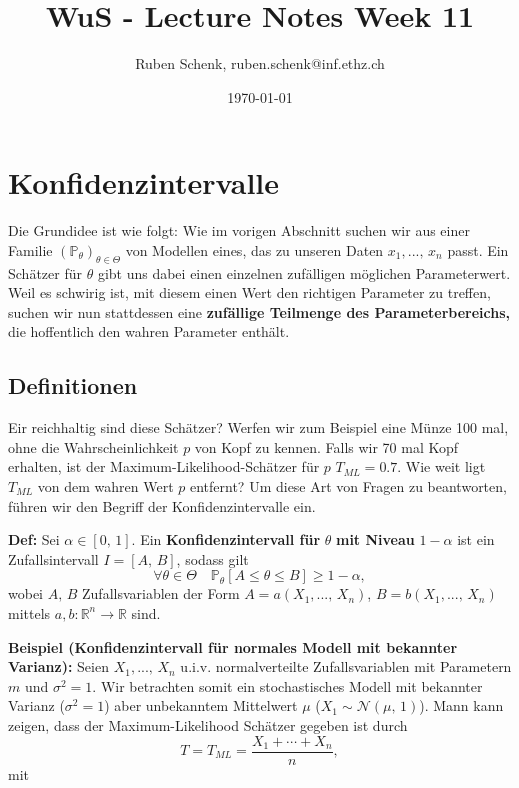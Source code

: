 \documentclass[a4paper]{extarticle}
\title{WuS - Lecture Notes Week 11}
\author{Ruben Schenk, ruben.schenk@inf.ethz.ch}
\date{\today}
\begin{document}
\maketitle

\section{Konfidenzintervalle}

Die Grundidee ist wie folgt: Wie im vorigen Abschnitt suchen wir aus einer Familie $(\mathbb{P}_{\theta})_{\theta \in \Theta}$ von Modellen eines, das zu unseren Daten $x_1,..., \, x_n$ passt. Ein Schätzer für $\theta$ gibt uns dabei einen einzelnen zufälligen möglichen Parameterwert. Weil es schwirig ist, mit diesem einen Wert den richtigen Parameter zu treffen, suchen wir nun stattdessen eine \textbf{zufällige Teilmenge des Parameterbereichs,} die hoffentlich den wahren Parameter enthält.

\subsection{Definitionen}

Eir reichhaltig sind diese Schätzer? Werfen wir zum Beispiel eine Münze 100 mal, ohne die Wahrscheinlichkeit $p$ von Kopf zu kennen. Falls wir 70 mal Kopf erhalten, ist der Maximum-Likelihood-Schätzer für $p$ $T_{ML} = 0.7$. Wie weit ligt $T_{ML}$ von dem wahren Wert $p$ entfernt? Um diese Art von Fragen zu beantworten, führen wir den Begriff der Konfidenzintervalle ein.

\textbf{Def:} Sei $\alpha \in [0, \, 1]$. Ein \textbf{Konfidenzintervall für} $\theta$ \textbf{mit Niveau} $1 - \alpha$ ist ein Zufallsintervall $I = [A, \, B]$, sodass gilt
\[
    \forall \theta \in \Theta \quad \mathbb{P}_{\theta}[A \leq \theta \leq B] \geq 1 - \alpha,
\]
wobei $A, \, B$ Zufallsvariablen der Form $A = a(X_1,..., \, X_n)$, $B = b(X_1,..., \, X_n)$ mittels $a,b : \mathbb{R}^n \to \mathbb{R}$ sind.

\begin{ebox}
    \textbf{Beispiel (Konfidenzintervall für normales Modell mit bekannter Varianz):} Seien $X_1,..., \, X_n$ u.i.v. normalverteilte Zufallsvariablen mit Parametern $m$ und $\sigma^2 = 1.$ Wir betrachten somit ein stochastisches Modell mit bekannter Varianz ($\sigma^2 = 1$) aber unbekanntem Mittelwert $\mu$ ($X_1 \sim \mathcal{N}(\mu, \, 1)$). Mann kann zeigen, dass der Maximum-Likelihood Schätzer gegeben ist durch
    \[
        T = T_{ML} = \frac{X_1 + \cdots + X_n}{n},
    \]
    mit
\end{ebox}
\end{document}
